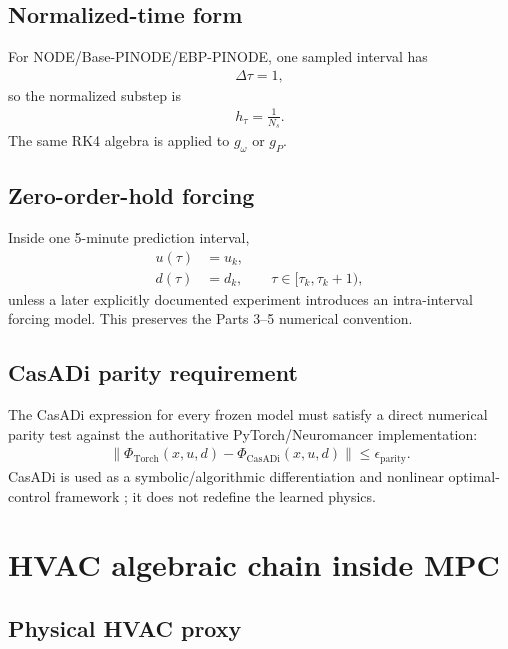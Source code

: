 \documentclass[11pt]{article}
\begin{document}
\subsection{Normalized-time form}

For NODE/Base-PINODE/EBP-PINODE, one sampled interval has
\begin{align}
\Delta\tau=1,
\end{align}
so the normalized substep is
\begin{align}
h_\tau=\frac{1}{N_s}.
\end{align}
The same RK4 algebra is applied to \(g_\omega\) or \(g_P\).

\subsection{Zero-order-hold forcing}

Inside one 5-minute prediction interval,
\begin{align}
u(\tau)&=u_k,
\\
d(\tau)&=d_k,
\qquad
\tau\in[\tau_k,\tau_k+1),
\tag{6.19}
\end{align}
unless a later explicitly documented experiment introduces an intra-interval forcing model.
This preserves the Parts 3--5 numerical convention.

\subsection{CasADi parity requirement}

The CasADi expression for every frozen model must satisfy a direct numerical parity test against
the authoritative PyTorch/Neuromancer implementation:
\begin{align}
\boxed{
\left\|
\Phi_{\mathrm{Torch}}(x,u,d)
-
\Phi_{\mathrm{CasADi}}(x,u,d)
\right\|
\le\epsilon_{\mathrm{parity}}.
}
\tag{6.20}
\end{align}
CasADi is used as a symbolic/algorithmic differentiation and nonlinear optimal-control framework
\citep{andersson2019casadi}; it does not redefine the learned physics.

\section{HVAC algebraic chain inside MPC}

\subsection{Physical HVAC proxy}
\end{document}
